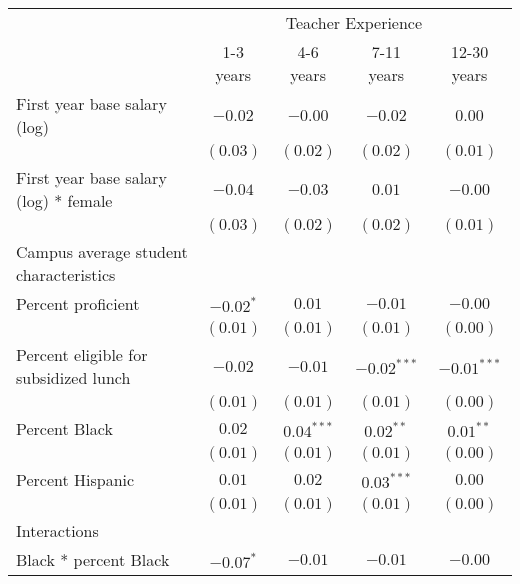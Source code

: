 \documentclass[]{article}
\begin{document}
\begin{table}
\begin{center}
\begin{tabular}{l c c c c }
\hline
 & \multicolumn{4}{c}{Teacher Experience} \\ \cline{2-5}
 & 1-3 years & 4-6 years & 7-11 years & 12-30 years \\
\hline
First year base salary (log)                & $-0.02$     & $-0.00$      & $-0.02$       & $0.00$        \\
                                            & $(0.03)$    & $(0.02)$     & $(0.02)$      & $(0.01)$      \\
First year base salary (log) * female       & $-0.04$     & $-0.03$      & $0.01$        & $-0.00$       \\
                                            & $(0.03)$    & $(0.02)$     & $(0.02)$      & $(0.01)$      \\
Campus average student characteristics      &             &              &               &               \\
\quad Percent proficient                    & $-0.02^{*}$ & $0.01$       & $-0.01$       & $-0.00$       \\
                                            & $(0.01)$    & $(0.01)$     & $(0.01)$      & $(0.00)$      \\
\quad Percent eligible for subsidized lunch & $-0.02$     & $-0.01$      & $-0.02^{***}$ & $-0.01^{***}$ \\
                                            & $(0.01)$    & $(0.01)$     & $(0.01)$      & $(0.00)$      \\
\quad Percent Black                         & $0.02$      & $0.04^{***}$ & $0.02^{**}$   & $0.01^{**}$   \\
                                            & $(0.01)$    & $(0.01)$     & $(0.01)$      & $(0.00)$      \\
\quad Percent Hispanic                      & $0.01$      & $0.02$       & $0.03^{***}$  & $0.00$        \\
                                            & $(0.01)$    & $(0.01)$     & $(0.01)$      & $(0.00)$      \\
Interactions                                &             &              &               &               \\
\quad Black * percent Black                 & $-0.07^{*}$ & $-0.01$      & $-0.01$       & $-0.00$       \\

\end{tabular}
\end{center}
\end{table}
\end{document}

